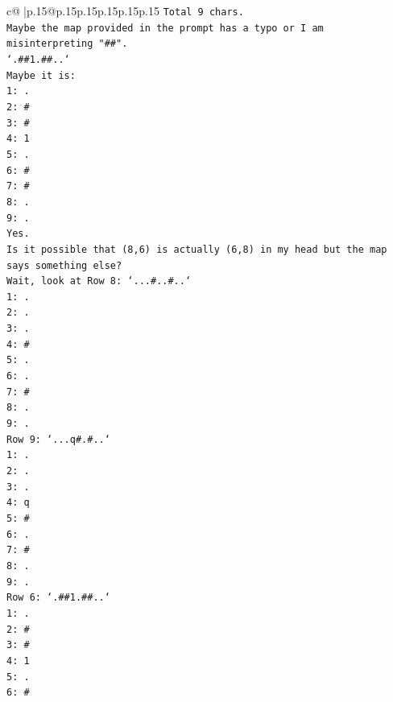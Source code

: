 \documentclass{article}
\begin{document}
{\begin{supertabular}{c@{$\;$}|p{.15\linewidth}@{}p{.15\linewidth}p{.15\linewidth}p{.15\linewidth}p{.15\linewidth}p{.15\linewidth}}
{{{\texttt{Total 9 chars.} \\
\texttt{Maybe the map provided in the prompt has a typo or I am misinterpreting "\#\#".} \\
\texttt{`.\#\#1.\#\#..`} \\
\texttt{Maybe it is:} \\
\texttt{1: .} \\
\texttt{2: \#} \\
\texttt{3: \#} \\
\texttt{4: 1} \\
\texttt{5: .} \\
\texttt{6: \#} \\
\texttt{7: \#} \\
\texttt{8: .} \\
\texttt{9: .} \\
\texttt{Yes.} \\
\texttt{Is it possible that (8,6) is actually (6,8) in my head but the map says something else?} \\
\texttt{Wait, look at Row 8: `...\#..\#..`} \\
\texttt{1: .} \\
\texttt{2: .} \\
\texttt{3: .} \\
\texttt{4: \#} \\
\texttt{5: .} \\
\texttt{6: .} \\
\texttt{7: \#} \\
\texttt{8: .} \\
\texttt{9: .} \\
\texttt{Row 9: `...q\#.\#..`} \\
\texttt{1: .} \\
\texttt{2: .} \\
\texttt{3: .} \\
\texttt{4: q} \\
\texttt{5: \#} \\
\texttt{6: .} \\
\texttt{7: \#} \\
\texttt{8: .} \\
\texttt{9: .} \\
\texttt{Row 6: `.\#\#1.\#\#..`} \\
\texttt{1: .} \\
\texttt{2: \#} \\
\texttt{3: \#} \\
\texttt{4: 1} \\
\texttt{5: .} \\
\texttt{6: \#} \\
}}}
\end{supertabular}}
\end{document}
